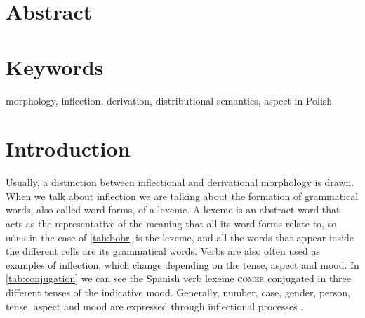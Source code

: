 \documentclass[12pt]{article}
\begin{document}
\section*{Abstract}

\section*{Keywords}
morphology, inflection, derivation, distributional semantics, aspect in Polish

\newpage
\tableofcontents
\newpage


\newpage
\section{Introduction}

Usually, a distinction between inflectional and derivational morphology is drawn. When we talk about inflection we are talking about the formation of grammatical words, also called word-forms, of a lexeme. A lexeme is an abstract word that acts as the representative of the meaning that all its word-forms relate to, so \textsc{bóbr} in the case of \autoref{tab:bobr} is the lexeme, and all the words that appear inside the different cells are its grammatical words. Verbs are also often used as examples of inflection, which change depending on the tense, aspect and mood. In \autoref{tab:conjugation} we can see the Spanish verb lexeme \textsc{comer} conjugated in three different tenses of the indicative mood. Generally, number, case, gender, person, tense, aspect and mood are expressed through inflectional processes \parencite{haspelmath2013UnderstandingMorphology,aronoff2011WhatMorphology}.
\end{document}
